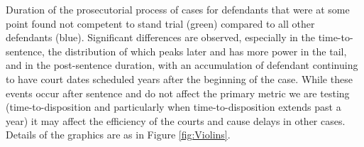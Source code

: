 Duration of the prosecutorial process of cases for defendants that were at some point found not competent to stand trial (green) compared to all other defendants (blue). Significant differences are observed, especially in the time-to-sentence, the distribution of which peaks later and has more power in the tail, and in the post-sentence duration, with an accumulation of defendant continuing to have court dates scheduled years after the beginning of the case. While these events occur after sentence and do not affect the primary metric we are testing (time-to-disposition and particularly when time-to-disposition extends past a year) it may affect the efficiency of the courts and cause delays in other cases. Details of the graphics are as in Figure \ref{fig:Violins}.
\label{fig:ViolinsCompetency}